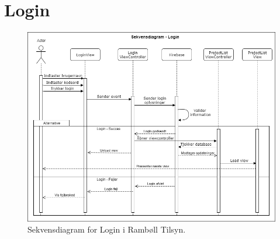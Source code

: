 \section{Login}

\begin{figure}[H] %
	\centering
	\includegraphics[width=1.1\textwidth]{../ArkitekturDesign/Design/Login/LoginSekvensDiagram}
	\caption{Sekvensdiagram for Login i Rambøll Tilsyn.}
	\label{fig:LoginSekvens}
\end{figure}